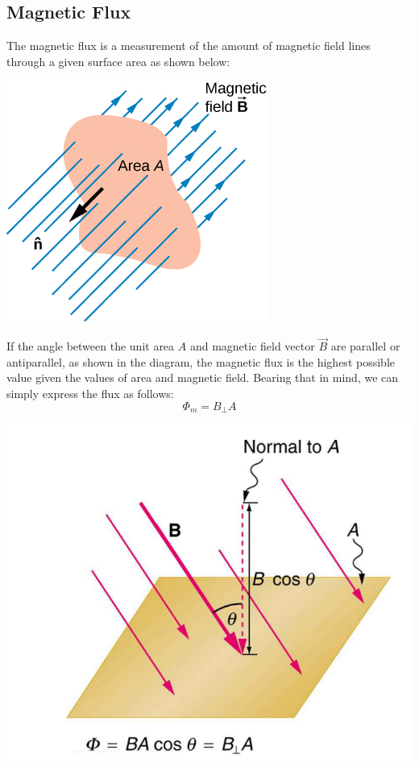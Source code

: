 \documentclass[11pt]{article}
\begin{document}
	\subsection*{Magnetic Flux}
	The magnetic flux is a measurement of the amount of magnetic field lines through a given surface area as shown below:
	\begin{center}
		\includegraphics[scale=0.6]{flux_area}
	\end{center}
	If the angle between the unit area $\hat{A}$ and magnetic field vector $\vec{B}$ are parallel or antiparallel, as shown in the diagram, the magnetic flux is the highest possible value given the values of area and magnetic field. Bearing that in mind, we can simply express the flux as follows:
	$$\Phi_m=B_\perp A$$
	\begin{center}
		\includegraphics[scale=0.18]{flux}
	\end{center}
\end{document}
